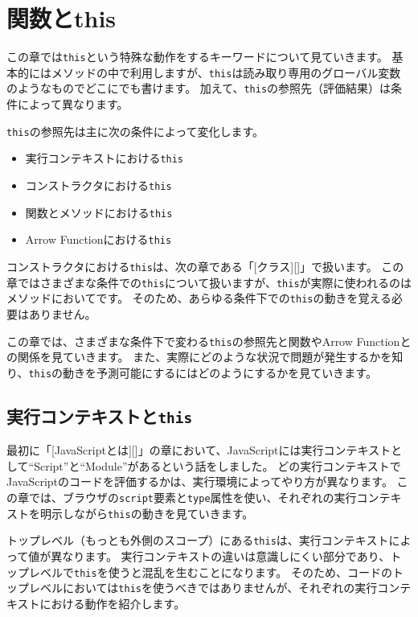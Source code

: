 \hypertarget{function-this}{%
\chapter{関数とthis}\label{function-this}}

この章では\texttt{this}という特殊な動作をするキーワードについて見ていきます。
基本的にはメソッドの中で利用しますが、\texttt{this}は読み取り専用のグローバル変数のようなものでどこにでも書けます。
加えて、\texttt{this}の参照先（評価結果）は条件によって異なります。

\texttt{this}の参照先は主に次の条件によって変化します。

\begin{itemize}
\item
  実行コンテキストにおける\texttt{this}
\item
  コンストラクタにおける\texttt{this}
\item
  関数とメソッドにおける\texttt{this}
\item
  Arrow Functionにおける\texttt{this}
\end{itemize}

コンストラクタにおける\texttt{this}は、次の章である「{[}クラス{]}{[}{]}」で扱います。
この章ではさまざまな条件での\texttt{this}について扱いますが、\texttt{this}が実際に使われるのはメソッドにおいてです。
そのため、あらゆる条件下での\texttt{this}の動きを覚える必要はありません。

この章では、さまざまな条件下で変わる\texttt{this}の参照先と関数やArrow
Functionとの関係を見ていきます。
また、実際にどのような状況で問題が発生するかを知り、\texttt{this}の動きを予測可能にするにはどのようにするかを見ていきます。

\hypertarget{execution-context-this}{%
\section{\texorpdfstring{実行コンテキストと\texttt{this}}{実行コンテキストとthis}}\label{execution-context-this}}

最初に「{[}JavaScriptとは{]}{[}{]}」の章において、JavaScriptには実行コンテキストとして``Script''と``Module''があるという話をしました。
どの実行コンテキストでJavaScriptのコードを評価するかは、実行環境によってやり方が異なります。
この章では、ブラウザの\texttt{script}要素と\texttt{type}属性を使い、それぞれの実行コンテキストを明示しながら\texttt{this}の動きを見ていきます。

トップレベル（もっとも外側のスコープ）にある\texttt{this}は、実行コンテキストによって値が異なります。
実行コンテキストの違いは意識しにくい部分であり、トップレベルで\texttt{this}を使うと混乱を生むことになります。
そのため、コードのトップレベルにおいては\texttt{this}を使うべきではありませんが、それぞれの実行コンテキストにおける動作を紹介します。

